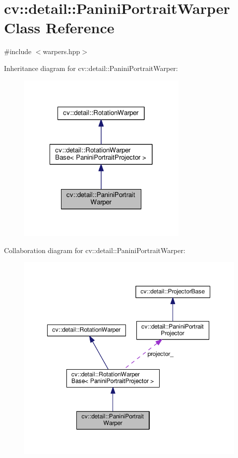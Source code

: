 \hypertarget{classcv_1_1detail_1_1PaniniPortraitWarper}{\section{cv\-:\-:detail\-:\-:Panini\-Portrait\-Warper Class Reference}
\label{classcv_1_1detail_1_1PaniniPortraitWarper}
}


{\ttfamily \#include $<$warpers.\-hpp$>$}



Inheritance diagram for cv\-:\-:detail\-:\-:Panini\-Portrait\-Warper\-:\nopagebreak
\begin{figure}[H]
\begin{center}
\leavevmode
\includegraphics[width=234pt]{classcv_1_1detail_1_1PaniniPortraitWarper__inherit__graph}
\end{center}
\end{figure}


Collaboration diagram for cv\-:\-:detail\-:\-:Panini\-Portrait\-Warper\-:\nopagebreak
\begin{figure}[H]
\begin{center}
\leavevmode
\includegraphics[width=350pt]{classcv_1_1detail_1_1PaniniPortraitWarper__coll__graph}
\end{center}
\end{figure}
